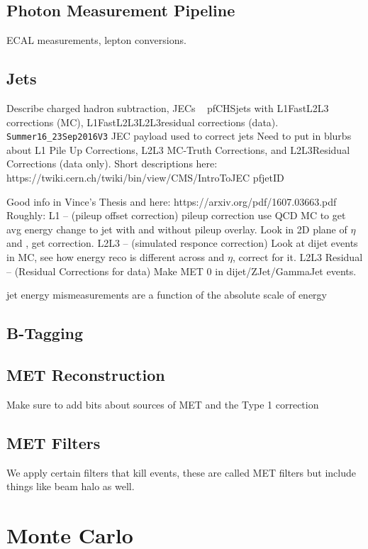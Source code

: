   \subsection{Photon Measurement Pipeline}
    ECAL measurements, lepton conversions.
  \subsection{Jets} \label{sec:jets}
    Describe charged hadron subtraction, JECs ~\cite{JERC}
    pfCHSjets with L1FastL2L3 corrections (MC), L1FastL2L3L2L3residual corrections (data).
    \verb=Summer16_23Sep2016V3= JEC payload used to correct jets
    Need to put in blurbs about L1 Pile Up Corrections, L2L3 MC-Truth Corrections, and L2L3Residual Corrections (data only). Short descriptions here: https://twiki.cern.ch/twiki/bin/view/CMS/IntroToJEC
    pfjetID


    Good info in Vince's Thesis and here: https://arxiv.org/pdf/1607.03663.pdf
    Roughly: L1 -- (pileup offset correction) pileup correction use QCD MC to get avg energy change to jet with and without pileup overlay. Look in 2D plane of $\eta$ and \pt, get correction.
    L2L3 -- (simulated responce correction) Look at dijet events in MC, see how energy reco is different across \pt and $\eta$, correct for it.
    L2L3 Residual -- (Residual Corrections for data) Make MET 0 in dijet/ZJet/GammaJet events.

    jet energy mismeasurements are a function of the absolute scale of energy
  \subsection{B-Tagging} \label{sec:b-tagging}

  \subsection{MET Reconstruction} \label{sec:MET_reco}
    Make sure to add bits about sources of MET and the Type 1 correction
  \subsection{MET Filters} \label{sec:met_filters} 
    We apply certain filters that kill events, these are called MET filters but include things like beam halo as well.

\section{Monte Carlo}
